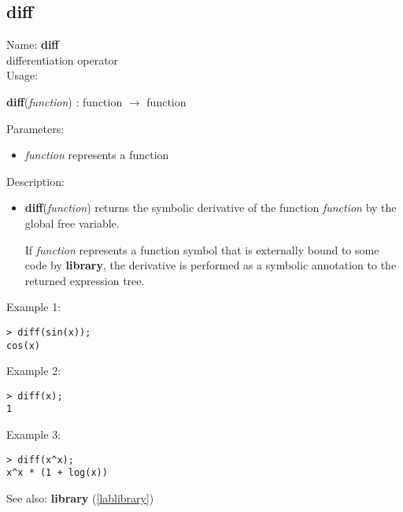 \subsection{diff}
\label{labdiff}
\noindent Name: \textbf{diff}\\
differentiation operator\\
\noindent Usage: 
\begin{center}
\textbf{diff}(\emph{function}) : \textsf{function} $\rightarrow$ \textsf{function}
\\ 
\end{center}
Parameters: 
\begin{itemize}
\item \emph{function} represents a function
\end{itemize}
\noindent Description: \begin{itemize}

\item \textbf{diff}(\emph{function}) returns the symbolic derivative of the function
   \emph{function} by the global free variable.
    
   If \emph{function} represents a function symbol that is externally bound
   to some code by \textbf{library}, the derivative is performed as a symbolic
   annotation to the returned expression tree.
\end{itemize}
\noindent Example 1: 
\begin{center}\begin{minipage}{15cm}\begin{Verbatim}[frame=single]
> diff(sin(x));
cos(x)
\end{Verbatim}
\end{minipage}\end{center}
\noindent Example 2: 
\begin{center}\begin{minipage}{15cm}\begin{Verbatim}[frame=single]
> diff(x);
1
\end{Verbatim}
\end{minipage}\end{center}
\noindent Example 3: 
\begin{center}\begin{minipage}{15cm}\begin{Verbatim}[frame=single]
> diff(x^x);
x^x * (1 + log(x))
\end{Verbatim}
\end{minipage}\end{center}
See also: \textbf{library} (\ref{lablibrary})
